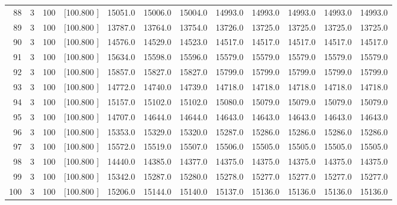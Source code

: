 \documentclass[12pt,a4paper]{article}
\begin{document}
\begin{center}
{\begin{tabular}{r r r r r r r r r r r r}
  88&  3&100&[100.800   ]& 15051.0& 15006.0& 15004.0& 14993.0& 14993.0& 14993.0& 14993.0& 14993.0\\[-0.02in]
  89&  3&100&[100.800   ]& 13787.0& 13764.0& 13754.0& 13726.0& 13725.0& 13725.0& 13725.0& 13725.0\\[-0.02in]
  90&  3&100&[100.800   ]& 14576.0& 14529.0& 14523.0& 14517.0& 14517.0& 14517.0& 14517.0& 14517.0\\[-0.02in]
  91&  3&100&[100.800   ]& 15634.0& 15598.0& 15596.0& 15579.0& 15579.0& 15579.0& 15579.0& 15579.0\\[-0.02in]
  92&  3&100&[100.800   ]& 15857.0& 15827.0& 15827.0& 15799.0& 15799.0& 15799.0& 15799.0& 15799.0\\[-0.02in]
  93&  3&100&[100.800   ]& 14772.0& 14740.0& 14739.0& 14718.0& 14718.0& 14718.0& 14718.0& 14718.0\\[-0.02in]
  94&  3&100&[100.800   ]& 15157.0& 15102.0& 15102.0& 15080.0& 15079.0& 15079.0& 15079.0& 15079.0\\[-0.02in]
  95&  3&100&[100.800   ]& 14707.0& 14644.0& 14644.0& 14643.0& 14643.0& 14643.0& 14643.0& 14643.0\\[-0.02in]
  96&  3&100&[100.800   ]& 15353.0& 15329.0& 15320.0& 15287.0& 15286.0& 15286.0& 15286.0& 15286.0\\[-0.02in]
  97&  3&100&[100.800   ]& 15572.0& 15519.0& 15507.0& 15506.0& 15505.0& 15505.0& 15505.0& 15505.0\\[-0.02in]
  98&  3&100&[100.800   ]& 14440.0& 14385.0& 14377.0& 14375.0& 14375.0& 14375.0& 14375.0& 14375.0\\[-0.02in]
  99&  3&100&[100.800   ]& 15342.0& 15287.0& 15280.0& 15278.0& 15277.0& 15277.0& 15277.0& 15277.0\\[-0.02in]
 100&  3&100&[100.800   ]& 15206.0& 15144.0& 15140.0& 15137.0& 15136.0& 15136.0& 15136.0& 15136.0\\[-0.02in]

\hline
\end{tabular}}
\end{center}
\newpage
\end{document}
